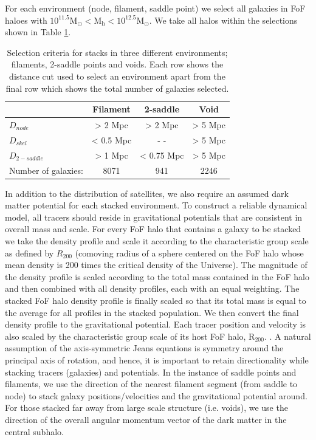 For each environment (node, filament, saddle point) we select all galaxies in FoF haloes with $\mathrm{10^{11.5} M_{\odot} < M_{h} < 10^{12.5} M_{\odot}}$. We take all halos within the selections shown in Table \ref{tab:stacking}. 

\begin{table}
\centering
\begin{tabular}{|l|c|c|c|}
\hline
& Filament & 2-saddle & Void \\ \hline
$D_{node}$ & > 2 Mpc & > 2 Mpc & > 5 Mpc \\
$D_{skel}$ & < 0.5 Mpc  & - - & > 5 Mpc \\
$D_{2-saddle}$ & > 1 Mpc & < 0.75 Mpc & > 5 Mpc \\
Number of galaxies: & 8071 & 941 & 2246 \\
\hline
\end{tabular}
\caption{Selection criteria for stacks in three different environments; filaments, 2-saddle points and voids. Each row shows the distance cut used to select an environment apart from the final row which shows the total number of galaxies selected.}
\label{tab:stacking}
\end{table}

In addition to the distribution of satellites, we also require an assumed dark matter potential for each stacked environment. To construct a reliable dynamical model, all tracers should reside in gravitational potentials that are consistent in overall mass and scale. For every FoF halo that contains a galaxy to be stacked we take the density profile and scale it according to the characteristic group scale as defined by $R_{200}$ (comoving radius of a sphere centered on the FoF halo whose mean density is 200 times the critical density of the Universe). The magnitude of the density profile is scaled according to the total mass contained in the FoF halo and then combined with all density profiles, each with an equal weighting. The stacked FoF halo density profile is finally scaled so that its total mass is equal to the average for all profiles in the stacked population. We then convert the final density profile to the gravitational potential. Each tracer position and velocity is also scaled by the characteristic group scale of its host FoF halo, $\mathrm{R_{200}}$. . 
A natural assumption of the axis-symmetric Jeans equations is symmetry around the principal axis of rotation, and hence, it is important to retain directionality while stacking tracers (galaxies) and potentials. In the instance of saddle points and filaments, we use the direction of the nearest filament segment (from saddle to node) to stack galaxy positions/velocities and the gravitational potential around. For those stacked far away from large scale structure (i.e. voids), we use the direction of the overall angular momentum vector of the dark matter in the central subhalo.

